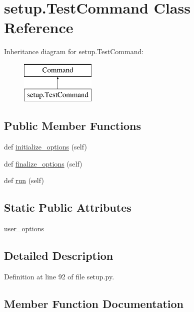 \hypertarget{classsetup_1_1_test_command}{}\section{setup.\+Test\+Command Class Reference}
\label{classsetup_1_1_test_command}
Inheritance diagram for setup.\+Test\+Command\+:\begin{figure}[H]
\begin{center}
\leavevmode
\includegraphics[height=2.000000cm]{classsetup_1_1_test_command}
\end{center}
\end{figure}
\subsection*{Public Member Functions}
\begin{DoxyCompactItemize}
\item 
def \hyperlink{classsetup_1_1_test_command_a56edfe460bf9d3060b756f76fe852aca}{initialize\+\_\+options} (self)
\item 
def \hyperlink{classsetup_1_1_test_command_a018f41939c48b54cad7a9c23a497b3fb}{finalize\+\_\+options} (self)
\item 
def \hyperlink{classsetup_1_1_test_command_a69d87950f830c82d695e6d3e78221a59}{run} (self)
\end{DoxyCompactItemize}
\subsection*{Static Public Attributes}
\begin{DoxyCompactItemize}
\item 
\hyperlink{classsetup_1_1_test_command_af93f4307f9c9c86d8f81b44030052022}{user\+\_\+options}
\end{DoxyCompactItemize}


\subsection{Detailed Description}


Definition at line 92 of file setup.\+py.



\subsection{Member Function Documentation}
